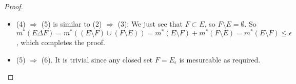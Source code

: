 \documentclass[11pt]{article}
\begin{document}
\begin{itemize}
\begin{proof}
\begin{itemize}
Note that 
\begin{align*}
m^{*}(E\cap U) &\le \sum_{k=1}^{\infty}\abs{Q'_{k}}\\
\epsilon/2\ge m^{*}(E  \setminus  U)& \ge m^{*}(E) - \sum_{k=1}^{\infty}\abs{Q'_{k}}\\
m^{*}(E)\ge \sum_{k=1}^{\infty}\abs{Q'_{k}}& \ge m^{*}(E) -\epsilon/2.
\end{align*}
For $m^{*}(E)<\infty$, we see that $\sum_{k=1}^{\infty}\abs{Q'_{k}}<\infty$, so for given $\epsilon>0$, there exists $N\in \bN$ such that for all $m\ge N$
\begin{align*}
\sum_{k=m}^{\infty}\abs{Q'_{k}} < \epsilon/2;
\end{align*}
So we can choose a collection of $Q'_{1},\cdots, Q'_{m}$, $m\ge N$ such that $\bigcup_{k=1}^{m}Q'_{k} \subset E\cap U$. Note that it is possible since $m^{*}(E)\le m^{*}(E\cap U)+ \epsilon $ and $m^{*}(E)\ge \sum_{k=1}^{\infty}\abs{Q'_{k}} \ge m^{*}(E) -\epsilon/2$, thus $m^{*}(E\cap U) \ge m^{*}(\bigcup_{k=1}^{m}Q'_{k})$ for large $m$. 

We define $F\equiv \bigcup_{k=1}^{m}Q'_{k}$, and it is a closed set. Also $ \bigcup_{k=1}^{m}Q'_{k}= F \subset E\cap U \subset \bigcup_{k=1}^{\infty}Q'_{k}$. Then 
\begin{align*}
E-F &\subseteq E- \bigcup_{k=1}^{m}Q'_{k} \\
&= (E\cap U) \cup (E \setminus  U)- \bigcup_{k=1}^{m}Q'_{k}\\
&=\paren{E\cap U-  \bigcup_{k=1}^{m}Q'_{k}}\cup (E \setminus  U)\\
&\subseteq \paren{\bigcup_{k=m}^{\infty}Q'_{k}} \cup (E  \setminus  U)\\
m^{*}(E-F)&\le \sum_{k=m}^{\infty}\abs{Q'_{k}} + m^{*}(E  \setminus  U)\\
&\le \epsilon/2+ \epsilon/2 = \epsilon, 
\end{align*}which completes the proof. 

\item (4) $\Rightarrow$ (5) is similar to (2) $\Rightarrow$ (3): We just see that $F\subset E$, so $F \setminus  E = \emptyset$. So 
$m^{*}(E\Delta F)= m^{*}((E  \setminus  F)\cup (F \setminus  E) )= m^{*}(E  \setminus  F)+ m^{*}(F \setminus  E) = m^{*}(E  \setminus  F)\le \epsilon$, which completes the proof. 

\item (5) $\Rightarrow$ (6). It is trivial since any closed set $F = E_{\epsilon}$ is mesureable as required. 


\end{itemize}
\end{proof}
\end{itemize}
\end{document}
